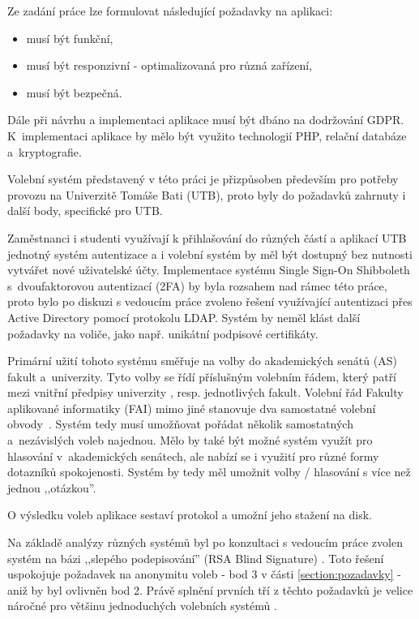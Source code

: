 Ze zadání práce lze formulovat následující požadavky na aplikaci:

\begin{itemize}
	\item musí být funkční,
	\item musí být responzivní - optimalizovaná pro různá zařízení,
	\item musí být bezpečná.
\end{itemize}

Dále při návrhu a implementaci aplikace musí být dbáno na dodržování GDPR. K~implementaci aplikace by mělo být využito technologií PHP, relační databáze a~kryptografie.

Volební systém představený v této práci je přizpůsoben především pro potřeby provozu na Univerzitě Tomáše Bati (UTB), proto byly do požadavků zahrnuty i další body, specifické pro UTB.

Zaměstnanci i studenti využívají k přihlašování do různých částí a aplikací UTB jednotný systém autentizace a i volební systém by měl být dostupný bez nutnosti vytvářet nové uživatelské účty. Implementace systému Single Sign-On Shibboleth \cite{eduId} s~dvoufaktorovou autentizací (2FA) by byla rozsahem nad rámec této práce, proto bylo po diskuzi s vedoucím práce zvoleno řešení využívající autentizaci přes Active Directory pomocí protokolu LDAP. Systém by neměl klást další požadavky na voliče, jako např. unikátní podpisové certifikáty.

Primární užití tohoto systému směřuje na volby do akademických senátů (AS) fakult a~univerzity. Tyto volby se řídí příslušným volebním řádem, který patří mezi vnitřní předpisy univerzity \cite{volebniRadUTB}, resp. jednotlivých fakult. Volební řád Fakulty aplikované informatiky (FAI) mimo jiné stanovuje dva samostatné volební obvody~\cite{volebniRadFAI}. Systém tedy musí umožňovat pořádat několik samostatných a~nezávislých voleb najednou. Mělo by také být možné systém využít pro hlasování v~akademických senátech, ale nabízí se i využití pro různé formy dotazníků spokojenosti. Systém by tedy měl umožnit volby / hlasování s více než jednou ,,otázkou''.

O výsledku voleb aplikace sestaví protokol a umožní jeho stažení na disk.

Na základě analýzy různých systémů byl po konzultaci s vedoucím práce zvolen systém na bázi ,,slepého podepisování'' (RSA Blind Signature) \cite{chaum}. Toto řešení uspokojuje požadavek na anonymitu voleb - bod 3 v části \ref{section:pozadavky} - aniž by byl ovlivněn bod 2. Právě splnění prvních tří z těchto požadavků je velice náročné pro většinu jednoduchých volebních systémů \cite{Schneier1996}.

